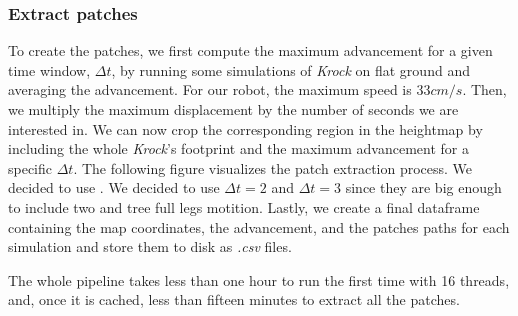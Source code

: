 \documentclass[../document.tex]{subfiles}
\begin{document}
\subsubsection{Extract patches}
To create the patches, we first compute the maximum advancement for a given time window, $\Delta t$, by running some simulations of \emph{Krock} on flat ground and averaging the advancement. For our robot, the maximum speed is $33cm/s$. Then, we multiply the maximum displacement by the number of seconds we are interested in. We can now crop the corresponding region in the heightmap by including the whole \emph{Krock}'s footprint and the maximum advancement for a specific $\Delta t$. The following figure visualizes the patch extraction process. We decided to use
. 
We decided to use $\Delta t = 2$ and $\Delta t = 3$ since they are big enough to include two and tree full legs motition. Lastly, we create a final dataframe containing the map coordinates, the advancement, and the patches paths for each simulation and store them to disk as \emph{.csv} files. 

The whole pipeline takes less than one hour to run the first time with 16 threads, and, once it is cached, less than fifteen minutes to extract all the patches. 
\end{document}

